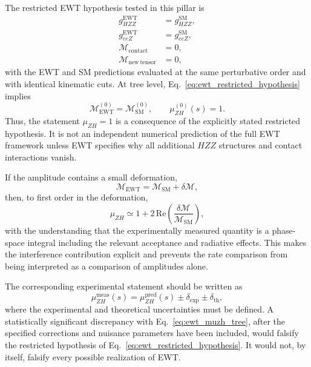 \documentclass[10pt,a4paper]{article}
\begin{document}
The restricted EWT hypothesis tested in this pillar is
\begin{equation}
	\begin{aligned}
		g_{HZZ}^{\mathrm{EWT}}&=g_{HZZ}^{\mathrm{SM}},\\
		g_{eeZ}^{\mathrm{EWT}}&=g_{eeZ}^{\mathrm{SM}},\\
		\mathcal{M}_{\mathrm{contact}}&=0,\\
		\mathcal{M}_{\mathrm{new\ tensor}}&=0,
	\end{aligned}
	\label{eq:ewt_restricted_hypothesis}
\end{equation}
with the EWT and SM predictions evaluated at the same perturbative order and with identical kinematic cuts. At tree level, Eq.~\eqref{eq:ewt_restricted_hypothesis} implies
\begin{equation}
	\mathcal{M}^{(0)}_{\mathrm{EWT}}
	=
	\mathcal{M}^{(0)}_{\mathrm{SM}},
	\qquad
	\mu_{ZH}^{(0)}(s)=1.
	\label{eq:ewt_muzh_tree}
\end{equation}
Thus, the statement $\mu_{ZH}=1$ is a consequence of the explicitly stated restricted hypothesis. It is not an independent numerical prediction of the full EWT framework unless EWT specifies why all additional $HZZ$ structures and contact interactions vanish.

If the amplitude contains a small deformation,
\begin{equation}
	\mathcal{M}_{\mathrm{EWT}}
	=\mathcal{M}_{\mathrm{SM}}+\delta\mathcal{M},
\end{equation}
then, to first order in the deformation,
\begin{equation}
	\mu_{ZH}
	\simeq
	1+2\,\mathrm{Re}\!\left(
	\frac{\delta\mathcal{M}}{\mathcal{M}_{\mathrm{SM}}}
	\right),
	\label{eq:ewt_interference_rate}
\end{equation}
with the understanding that the experimentally measured quantity is a phase-space integral including the relevant acceptance and radiative effects. This makes the interference contribution explicit and prevents the rate comparison from being interpreted as a comparison of amplitudes alone.

The corresponding experimental statement should be written as
\begin{equation}
	\mu_{ZH}^{\mathrm{meas}}(s)
	=
	\mu_{ZH}^{\mathrm{pred}}(s)
	\pm \delta_{\mathrm{exp}}
	\pm \delta_{\mathrm{th}},
\end{equation}
where the experimental and theoretical uncertainties must be defined. A statistically significant discrepancy with Eq.~\eqref{eq:ewt_muzh_tree}, after the specified corrections and nuisance parameters have been included, would falsify the restricted hypothesis of Eq.~\eqref{eq:ewt_restricted_hypothesis}. It would not, by itself, falsify every possible realization of EWT.
\end{document}
